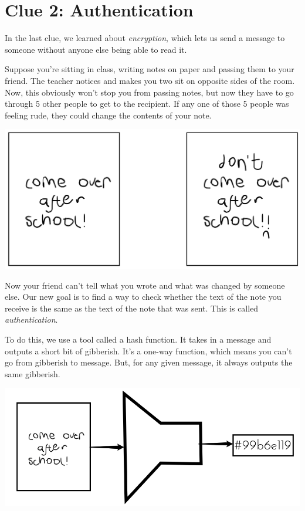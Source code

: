 \documentclass{article}
\begin{document}
\newpage

\section*{Clue 2: Authentication}

In the last clue, we learned about \textit{encryption}, which lets us send a message to someone without anyone else being able to read it. 

Suppose you're sitting in class, writing notes on paper and passing them to your friend. The teacher notices and makes you two sit on opposite sides of the room. Now, this obviously won't stop you from passing notes, but now they have to go through 5 other people to get to the recipient. If any one of those 5 people was feeling rude, they could change the contents of your note.

\begin{minipage}{\textwidth}
\centering
\includegraphics[width=.6\textwidth]{tampered}
\end{minipage}

Now your friend can't tell what you wrote and what was changed by someone else. Our new goal is to find a way to check whether the text of the note you receive is the same as the text of the note that was sent. This is called \textit{authentication}.

To do this, we use a tool called a hash function. It takes in a message and outputs a short bit of gibberish. It's a one-way function, which means you can't go from gibberish to message. But, for any given message, it always outputs the same gibberish. 

\begin{minipage}{\textwidth}
\centering
\includegraphics[width=.7\textwidth]{hash}
\end{minipage}
\end{document}
